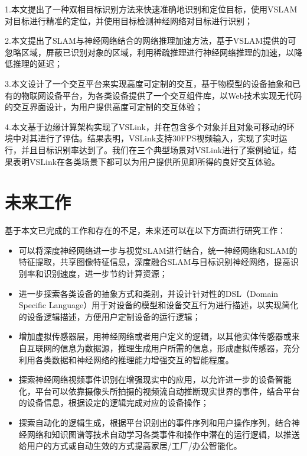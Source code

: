 1.本文提出了一种双相目标识别方法来快速准确地识别和定位目标，使用VSLAM对目标进行精准的定位，并使用目标检测神经网络对目标进行识别；

2.本文提出了SLAM与神经网络结合的网络推理加速方法，基于VSLAM提供的可忽略区域，屏蔽已识别对象的区域，利用稀疏推理进行神经网络推理的加速，以降低推理的延迟；

3.本文设计了一个交互平台来实现高度可定制的交互，基于物模型的设备抽象和已有的物联网设备平台，为各类设备提供了一个交互组件库，以Web技术实现无代码的交互界面设计，为用户提供高度可定制的交互体验；

4.本文基于边缘计算架构实现了VSLink，并在包含多个对象并且对象可移动的环境中对其进行了评估。结果表明，VSLink支持30FPS视频输入，实现了实时运行，并且目标识别率达到了{\acc}。我们在三个典型场景对VSLink进行了案例验证，结果表明VSLink在各类场景下都可以为用户提供所见即所得的良好交互体验。

\section{未来工作}
基于本文已完成的工作和存在的不足，未来还可以在以下方面进行研究工作：
\begin{itemize}
	\item 可以将深度神经网络进一步与视觉SLAM进行结合，统一神经网络和SLAM的特征提取，共享图像特征信息，深度融合SLAM与目标识别神经网络，提高识别率和识别速度，进一步节约计算资源；
	\item 进一步探索各类设备的抽象方式和类别，并设计针对性的DSL（Domain Specific Language）用于对设备的模型和设备交互行为进行描述，以实现简化的设备逻辑描述，方便用户定制设备的运行逻辑；
	\item 增加虚拟传感器层，用神经网络或者用户定义的逻辑，以其他实体传感器或来自互联网的信息为数据源，推理生成用户所需的信息，形成虚拟传感器，充分利用各类数据和神经网络的推理能力增强交互的智能程度。
	\item 探索神经网络视频事件识别在增强现实中的应用，以允许进一步的设备智能化，平台可以依靠摄像头所拍摄的视频流自动推断现实世界的事件，结合平台的设备信息，根据设定的逻辑完成对应的设备操作；
	\item 探索自动化的逻辑生成，根据平台识别出的事件序列和用户操作序列，结合神经网络和知识图谱等技术自动学习各类事件和操作中潜在的运行逻辑，以推送给用户的方式或自动生效的方式提高家居/工厂/办公智能化。
\end{itemize}

